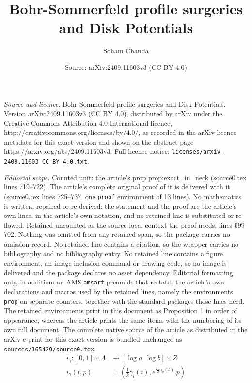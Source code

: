 \documentclass[10pt,a4paper]{amsart}
\title{Bohr-Sommerfeld profile surgeries and Disk Potentials}
\author{Soham Chanda}
\date{Source: arXiv:2409.11603v3 (CC BY 4.0)}
\renewcommand{\to}{\rightarrow}
\begin{document}
\maketitle

\noindent\emph{Source and licence.} Bohr-Sommerfeld profile surgeries and Disk Potentials. Version arXiv:2409.11603v3 (CC BY 4.0), distributed by arXiv under the Creative Commons Attribution 4.0 International licence, http://creativecommons.org/licenses/by/4.0/, as recorded in the arXiv licence metadata for this exact version and shown on the abstract page https://arxiv.org/abs/2409.11603v3. Full licence notice: \texttt{licenses/arxiv-2409.11603-CC-BY-4.0.txt}.\par\smallskip

\noindent\textit{Editorial scope.} Counted unit: the article's prop prop:exact\_in\_neck (source0.tex lines 719--722). The article's complete original proof of it is delivered with it (source0.tex lines 725--737, one \texttt{proof} environment of 13 lines). No mathematics is written, repaired or re-derived: the statement and the proof are the article's own lines, in the article's own notation, and no retained line is substituted or re-flowed.  Retained uncounted as the source-local context the proof needs: lines 699--702.  Nothing was omitted from any retained span, so the package carries no omission record.  No retained line contains a citation, so the wrapper carries no bibliography and no bibliography entry.  No retained line contains a figure environment, an image-inclusion command or drawing code, so no image is delivered and the package declares no asset dependency.  Editorial formatting only, in addition: an AMS \texttt{amsart} preamble that restates the article's own declarations and macros used by the retained lines, namely the environments \texttt{prop} on separate counters, together with the standard packages those lines need.  The retained environments print in this document as Proposition 1 in order of appearance, whereas the article prints the same items with the numbering of its own full document.  The complete native source of the article as distributed in the arXiv e-print for this exact version is bundled unchanged as \texttt{sources/165429/source0.tex}.
    \begin{align}\label{eq:handemb}      
    i_\gamma:[0,1]\times \Lambda &\to [\log a, \log b] \times Z \\
     i_\gamma(t,p) &= \left(\frac{1}{k}\gamma_l (t),e^{i\frac{1}{k}\gamma_\theta (t)}.p\right)
    \end{align}
\end{document}
